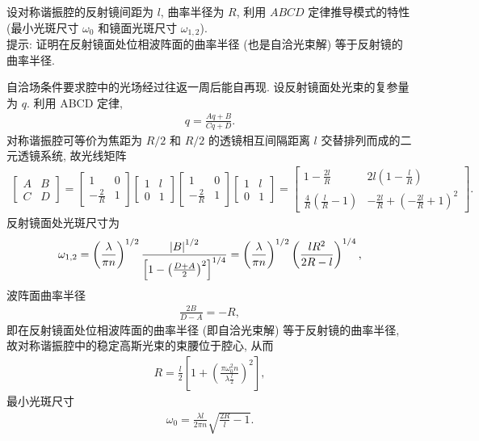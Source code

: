 \documentclass{note}
\begin{document}
\begin{exe}
    设对称谐振腔的反射镜间距为 $l$, 曲率半径为 $R$, 利用 $ABCD$ 定律推导模式的特性 (最小光斑尺寸 $\omega_0$ 和镜面光斑尺寸 $\omega_{1,2}$).\\
    提示: 证明在反射镜面处位相波阵面的曲率半径 (也是自洽光束解) 等于反射镜的曲率半径.
\end{exe}
\begin{sol}
    自洽场条件要求腔中的光场经过往返一周后能自再现. 设反射镜面处光束的复参量为 $q$. 利用 ABCD 定律,
    \begin{align}
        q=\frac{Aq+B}{Cq+D}.
    \end{align}
    对称谐振腔可等价为焦距为 $R/2$ 和 $R/2$ 的透镜相互间隔距离 $l$ 交替排列而成的二元透镜系统, 故光线矩阵
    \begin{align}
        \begin{bmatrix}
            A&B\\
            C&D
        \end{bmatrix}=\begin{bmatrix}
            1&0\\
            -\frac{2}{R}&1
        \end{bmatrix}\begin{bmatrix}
            1&l\\
            0&1
        \end{bmatrix}\begin{bmatrix}
            1&0\\
            -\frac{2}{R}&1
        \end{bmatrix}\begin{bmatrix}
            1&l\\
            0&1
        \end{bmatrix}=\begin{bmatrix}
            1-\frac{2l}{R}&2l\left(1-\frac{l}{R}\right)\\
            \frac{4}{R}\left(\frac{l}{R}-1\right)&-\frac{2l}{R}+\left(-\frac{2l}{R}+1\right)^2
        \end{bmatrix}.
    \end{align}
    反射镜面处光斑尺寸为
    \begin{align}
        \omega_{1,2}=\left(\frac{\lambda}{\pi n}\right)^{1/2}\frac{\left\lvert B\right\rvert^{1/2}}{\left[1-\left(\frac{D+A}{2}\right)^2\right]^{1/4}}=\left(\frac{\lambda}{\pi n}\right)^{1/2}\left(\frac{lR^2}{2R-l}\right)^{1/4},
    \end{align}
    波阵面曲率半径
    \begin{align}
        \frac{2B}{D-A}=-R,
    \end{align}
    即在反射镜面处位相波阵面的曲率半径 (即自洽光束解) 等于反射镜的曲率半径, 故对称谐振腔中的稳定高斯光束的束腰位于腔心, 从而
    \begin{align}
        R=\frac{l}{2}\left[1+\left(\frac{\pi\omega_0^2n}{\lambda\frac{l}{2}}\right)^2\right],
    \end{align}
    最小光斑尺寸
    \begin{align}
        \omega_0=\frac{\lambda l}{2\pi n}\sqrt{\frac{2R}{l}-1}.
    \end{align}
\end{sol}
\end{document}
